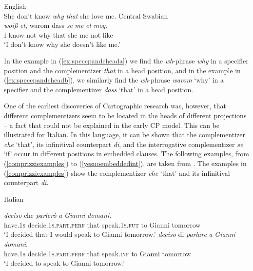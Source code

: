 \begin{exe}
\ex\begin{xlist}
\ex English \\ She don't know \textit{why that} she love me. \label{ex:speccpandcheada}
\ex Central Swabian \\  {\textit{woi\ss }}  {\textit{et},} {warom} {dass} {\textit{se}} {\textit{me}} {\textit{et}} {\textit{mog}.} \\
{I} {know} {not} {why} {that} {she} {me} {not} {like} \\
\trans `I don't know why she doesn't like me.' \label{ex:speccpandcheadb}
\end{xlist}
\end{exe}

\noindent In the example in (\ref{ex:speccpandcheada}) we find the \textit{wh}-phrase \textit{why} in a specifier position and the complementizer \textit{that} in a head position, and in the example in (\ref{ex:speccpandcheadb}), we similarly find the \textit{wh}-phrase \textit{warom} `why' in a specifier and the complementizer \textit{dass} `that' in a head position.

One of the earliest discoveries of Cartographic research was, however, that different complementizers seem to be located in the heads of different projections \citep{rizzi1997fine} -- a fact that could not be explained in the early CP model. This can be illustrated for Italian. In this language, it can be shown that the complementizer \textit{che} `that', its infinitival counterpart \textit{di}, and the interrogative complementizer \textit{se} `if' occur in different positions in embedded clauses. The following examples, from (\ref{comprizziexamples}) to (\ref{yesnoembeddedint}), are taken from \citet[205]{rizzi2013notes}. The examples in (\ref{comprizziexamples}) show the complementizer \textit{che} `that' and its infinitival counterpart \textit{di}.

\begin{exe}
\ex Italian \citep[205]{rizzi2013notes}\label{comprizziexamples}\begin{xlist}
\ex {} {\textit{deciso}} {che} {\textit{parlerò}} {\textit{a}} {\textit{Gianni}} {\textit{domani}.} \\
{have.\textsc{1s}} {decide.\textsc{1s.part.perf}} {that} {speak.\textsc{1s.fut}} {to} {Gianni} {tomorrow} \\
\trans `I decided that I would speak to Gianni tomorrow.' \label{ex:comprizzia}
\ex {} {\textit{deciso}} {di} {\textit{parlare}} {\textit{a}} {\textit{Gianni}} {\textit{domani}.} \\
{have.\textsc{1s}} {decide.\textsc{1s.part.perf}} {that} {speak.\textsc{inf}} {to} {Gianni} {tomorrow} \\
\trans `I decided to speak to Gianni tomorrow.' \label{ex:comprizzib}
\end{xlist}
\end{exe}


